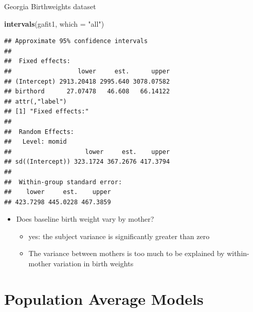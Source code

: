 \documentclass[
  ignorenonframetext,
]{beamer}
\newenvironment{Shaded}{\begin{snugshade}}{\end{snugshade}}
\newcommand{\DataTypeTok}[1]{\textcolor[rgb]{0.13,0.29,0.53}{#1}}
\newcommand{\KeywordTok}[1]{\textcolor[rgb]{0.13,0.29,0.53}{\textbf{#1}}}
\newcommand{\NormalTok}[1]{#1}
\newcommand{\StringTok}[1]{\textcolor[rgb]{0.31,0.60,0.02}{#1}}
\providecommand{\tightlist}{%
  \setlength{\itemsep}{0pt}\setlength{\parskip}{0pt}}
\begin{document}
\begin{frame}[fragile]{Georgia Birthweights dataset}
\protect\hypertarget{georgia-birthweights-dataset-4}{}

\tiny

\begin{Shaded}
\begin{Highlighting}[]
\KeywordTok{intervals}\NormalTok{(gafit1, }\DataTypeTok{which =} \StringTok{"all"}\NormalTok{)}
\end{Highlighting}
\end{Shaded}

\begin{verbatim}
## Approximate 95% confidence intervals
## 
##  Fixed effects:
##                  lower     est.      upper
## (Intercept) 2913.20418 2995.640 3078.07582
## birthord      27.07478   46.608   66.14122
## attr(,"label")
## [1] "Fixed effects:"
## 
##  Random Effects:
##   Level: momid 
##                    lower     est.    upper
## sd((Intercept)) 323.1724 367.2676 417.3794
## 
##  Within-group standard error:
##    lower     est.    upper 
## 423.7298 445.0228 467.3859
\end{verbatim}

\normalsize

\begin{itemize}
\tightlist
\item
  Does baseline birth weight vary by mother?

  \begin{itemize}
  \tightlist
  \item
    yes: the subject variance is significantly greater than zero
  \item
    The variance between mothers is too much to be explained by
    within-mother variation in birth weights
  \end{itemize}
\end{itemize}

\end{frame}

\hypertarget{population-average-models}{%
\section{Population Average Models}\label{population-average-models}}
\end{document}

